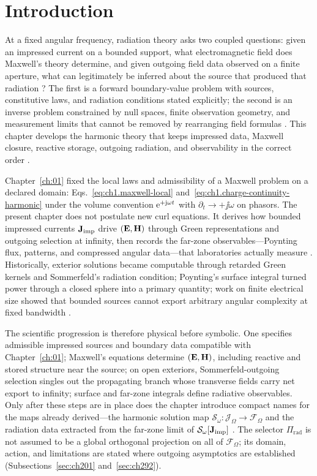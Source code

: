 \section{Introduction}
\label{sec:ch20}

At a fixed angular frequency, radiation theory asks two coupled questions: given an impressed current on a bounded support, what electromagnetic field does Maxwell's theory determine, and given outgoing field data observed on a finite aperture, what can legitimately be inferred about the source that produced that radiation \cite{harrington2001,stratton1941}? The first is a forward boundary-value problem with sources, constitutive laws, and radiation conditions stated explicitly; the second is an inverse problem constrained by null spaces, finite observation geometry, and measurement limits that cannot be removed by rearranging field formulas \cite{devaney2004}. This chapter develops the harmonic theory that keeps impressed data, Maxwell closure, reactive storage, outgoing radiation, and observability in the correct order \cite{maxwell1873}.

Chapter~\ref{ch:01} fixed the local laws and admissibility of a Maxwell problem on a declared domain: Eqs.~\eqref{eq:ch1.maxwell-local} and~\eqref{eq:ch1.charge-continuity-harmonic} under the volume convention $\mathrm{e}^{+\mathrm{j}\omega t}$ with $\partial_t\to+\jj\omega$ on phasors. The present chapter does not postulate new curl equations. It derives how bounded impressed currents $\mathbf{J}_{\mathrm{imp}}$ drive $(\mathbf{E},\mathbf{H})$ through Green representations and outgoing selection at infinity, then records the far-zone observables---Poynting flux, patterns, and compressed angular data---that laboratories actually measure \cite{stratton1941,sommerfeld1949,poynting1884}. Historically, exterior solutions became computable through retarded Green kernels and Sommerfeld's radiation condition; Poynting's surface integral turned power through a closed sphere into a primary quantity; work on finite electrical size showed that bounded sources cannot export arbitrary angular complexity at fixed bandwidth \cite{chu1948,harrington2001}.

The scientific progression is therefore physical before symbolic. One specifies admissible impressed sources and boundary data compatible with Chapter~\ref{ch:01}; Maxwell's equations determine $(\mathbf{E},\mathbf{H})$, including reactive and stored structure near the source; on open exteriors, Sommerfeld-outgoing selection singles out the propagating branch whose transverse fields carry net export to infinity; surface and far-zone integrals define radiative observables. Only after these steps are in place does the chapter introduce compact names for the maps already derived---the harmonic solution map $\mathcal{S}_\omega:\mathcal{J}_\Omega\to\mathcal{F}_\Omega$ and the radiation data extracted from the far-zone limit of $\mathcal{S}_\omega[\mathbf{J}_{\mathrm{imp}}]$ \cite{stratton1941}. The selector $\Pi_{\mathrm{rad}}$ is not assumed to be a global orthogonal projection on all of $\mathcal{F}_\Omega$; its domain, action, and limitations are stated where outgoing asymptotics are established (Subsections~\ref{sec:ch201} and~\ref{sec:ch292}).

